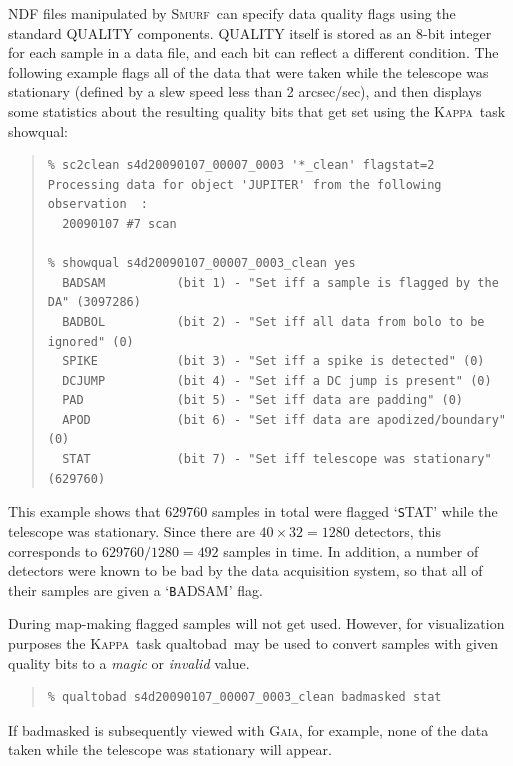 \documentclass[twoside,11pt]{article}
\newenvironment{myquote}{\begin{quote}\begin{small}}{\end{small}\end{quote}}
\newcommand{\Kappa}{\xref{\textsc{Kappa}}{sun95}{}}
\newcommand{\gaia}{\xref{\textsc{Gaia}}{sun214}{}}
\newcommand{\smurf}{\xref{\textsc{Smurf}}{sun258}{}}
\newcommand{\task}[1]{\textsf{#1}}
\newcommand{\qualtobad}{\xref{\task{qualtobad}}{sun95}{QUALTOBAD}}
\newcommand{\showqual}{\xref{\task{showqual}}{sun95}{SHOWQUAL}}
\newcommand{\xref}[3]{#1}
\renewcommand{\_}{\texttt{\symbol{95}}}
\begin{document}
NDF files manipulated by \smurf\ can specify data quality flags using
the standard QUALITY components. QUALITY itself is stored as an 8-bit
integer for each sample in a data file, and each bit can reflect a
different condition. The following example flags all of the data that
were taken while the telescope was stationary (defined by a slew speed
less than 2 arcsec/sec), and then displays some statistics about the
resulting quality bits that get set using the \Kappa\ task \showqual:

\begin{myquote}
\begin{verbatim}
% sc2clean s4d20090107_00007_0003 '*_clean' flagstat=2
Processing data for object 'JUPITER' from the following observation  :
  20090107 #7 scan

% showqual s4d20090107_00007_0003_clean yes
  BADSAM          (bit 1) - "Set iff a sample is flagged by the DA" (3097286)
  BADBOL          (bit 2) - "Set iff all data from bolo to be ignored" (0)
  SPIKE           (bit 3) - "Set iff a spike is detected" (0)
  DCJUMP          (bit 4) - "Set iff a DC jump is present" (0)
  PAD             (bit 5) - "Set iff data are padding" (0)
  APOD            (bit 6) - "Set iff data are apodized/boundary" (0)
  STAT            (bit 7) - "Set iff telescope was stationary" (629760)
\end{verbatim}
\end{myquote}

This example shows that 629760 samples in total were flagged `{\texttt
  STAT}' while the telescope was stationary. Since there are
$40\times32=1280$ detectors, this corresponds to $629760/1280=492$
samples in time. In addition, a number of detectors were known to be
bad by the data acquisition system, so that all of their samples are
given a `{\texttt BADSAM}' flag.

During map-making flagged samples will not get used. However, for
visualization purposes the \Kappa\ task \qualtobad\ may be used to
convert samples with given quality bits to a {\em magic\/} or {\em
  invalid\/} value.

\begin{myquote}
\begin{verbatim}
% qualtobad s4d20090107_00007_0003_clean badmasked stat
\end{verbatim}
\end{myquote}

If badmasked is subsequently viewed with \gaia, for example, none of
the data taken while the telescope was stationary will appear.
\end{document}
